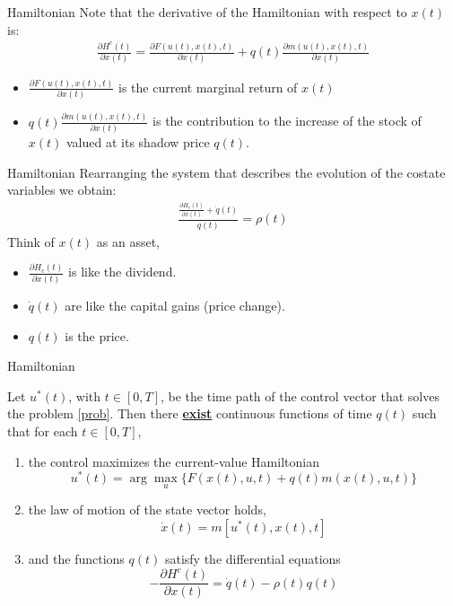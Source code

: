 \documentclass[aspectratio=169]{beamer}
\begin{document}
\begin{frame}{Hamiltonian}
    Note that the derivative of the Hamiltonian with respect to $x(t)$ is:
    \begin{align*}
        \frac{\partial H^c(t)}{\partial x(t)} = \frac{\partial F(u(t),x(t),t)}{\partial x(t)}+q(t)\frac{\partial m(u(t),x(t),t)}{\partial x(t)}
    \end{align*}
    \begin{itemize}
        \item <2-> $\frac{\partial F(u(t),x(t),t)}{\partial x(t)}$ is the current marginal return of $x(t)$
        \item <3-> $q(t)\frac{\partial m(u(t),x(t),t)}{\partial x(t)}$ is the contribution to the increase of the stock of $x(t)$ valued at its shadow price $q(t)$.
    \end{itemize}
\end{frame}

\begin{frame}{Hamiltonian}
    Rearranging the system that describes the evolution of the costate variables we obtain:
    \begin{align*}
        \frac{\frac{\partial H_c(t)}{\partial x(t)}+\dot{q}(t)}{q(t)}=\rho(t)
    \end{align*}
    Think of $x(t)$ as an asset,
    \begin{itemize}
        \item <2-> $\frac{\partial H_c(t)}{\partial x(t)}$ is like the dividend.
        \item <3-> $\dot{q}(t)$ are like the capital gains (price change).
        \item <4-> $q(t)$ is the price.
    \end{itemize}
\end{frame}

\begin{frame}{Hamiltonian}
    \begin{theorem}
        Let $u^*(t)$, with $t\in[0,T]$, be the time path of the control vector that solves the problem \eqref{prob}. Then there \underline{\textbf{exist}} continuous functions of time $q(t)$ such that for each $t\in[0,T]$,
        \begin{enumerate}
            \item the control maximizes the current-value Hamiltonian \[u^*(t)=\arg\max_{u}\{F(x(t),u,t)+q(t)m(x(t),u,t)\}\]
            \item the law of motion of the state vector holds, \[\dot{x}(t)=m[u^*(t),x(t),t]\]
            \item and the functions $q(t)$ satisfy the differential equations \[-\frac{\partial H^c(t)}{\partial x(t)}=\dot{q}(t)-\rho(t)q(t)\]
        \end{enumerate}
    \end{theorem}
\end{frame}
\end{document}

